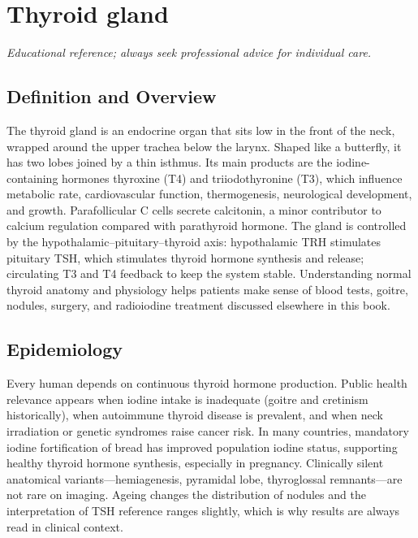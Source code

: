 \chapter{Thyroid gland}

\medskip
\noindent\textit{Educational reference; always seek professional advice for individual care.}

\section*{Definition and Overview}
The thyroid gland is an endocrine organ that sits low in the front of the neck, wrapped around the upper trachea below the larynx. Shaped like a butterfly, it has two lobes joined by a thin isthmus. Its main products are the iodine-containing hormones thyroxine (T4) and triiodothyronine (T3), which influence metabolic rate, cardiovascular function, thermogenesis, neurological development, and growth. Parafollicular C cells secrete calcitonin, a minor contributor to calcium regulation compared with parathyroid hormone. The gland is controlled by the hypothalamic--pituitary--thyroid axis: hypothalamic TRH stimulates pituitary TSH, which stimulates thyroid hormone synthesis and release; circulating T3 and T4 feedback to keep the system stable. Understanding normal thyroid anatomy and physiology helps patients make sense of blood tests, goitre, nodules, surgery, and radioiodine treatment discussed elsewhere in this book.

\section*{Epidemiology}
Every human depends on continuous thyroid hormone production. Public health relevance appears when iodine intake is inadequate (goitre and cretinism historically), when autoimmune thyroid disease is prevalent, and when neck irradiation or genetic syndromes raise cancer risk. In many countries, mandatory iodine fortification of bread has improved population iodine status, supporting healthy thyroid hormone synthesis, especially in pregnancy. Clinically silent anatomical variants---hemiagenesis, pyramidal lobe, thyroglossal remnants---are not rare on imaging. Ageing changes the distribution of nodules and the interpretation of TSH reference ranges slightly, which is why results are always read in clinical context.

